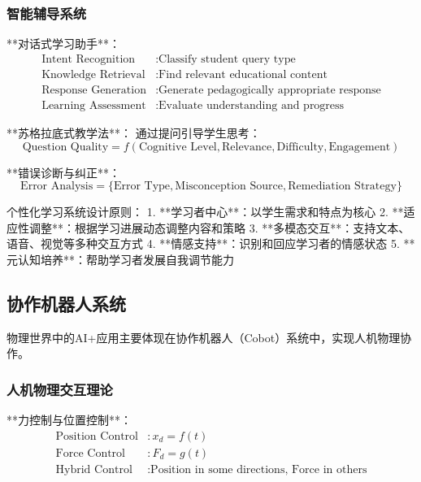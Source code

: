 \subsubsection{智能辅导系统} %

**对话式学习助手**：
\begin{align}
\text{Intent Recognition} &: \text{Classify student query type} \\
\text{Knowledge Retrieval} &: \text{Find relevant educational content} \\
\text{Response Generation} &: \text{Generate pedagogically appropriate response} \\
\text{Learning Assessment} &: \text{Evaluate understanding and progress}
\end{align}

**苏格拉底式教学法**：
通过提问引导学生思考：
\begin{equation}
\text{Question Quality} = f(\text{Cognitive Level}, \text{Relevance}, \text{Difficulty}, \text{Engagement})
\end{equation}

**错误诊断与纠正**：
\begin{equation}
\text{Error Analysis} = \{\text{Error Type}, \text{Misconception Source}, \text{Remediation Strategy}\}
\end{equation}

\begin{center}
个性化学习系统设计原则：
1. **学习者中心**：以学生需求和特点为核心
2. **适应性调整**：根据学习进展动态调整内容和策略
3. **多模态交互**：支持文本、语音、视觉等多种交互方式
4. **情感支持**：识别和回应学习者的情感状态
5. **元认知培养**：帮助学习者发展自我调节能力
\end{center}

\subsection{协作机器人系统}

物理世界中的AI+应用主要体现在协作机器人（Cobot）系统中，实现人机物理协作。

\subsubsection{人机物理交互理论} %

**力控制与位置控制**：
\begin{align}
\text{Position Control} &: x_d = f(t) \\
\text{Force Control} &: F_d = g(t) \\
\text{Hybrid Control} &: \text{Position in some directions, Force in others}
\end{align}

